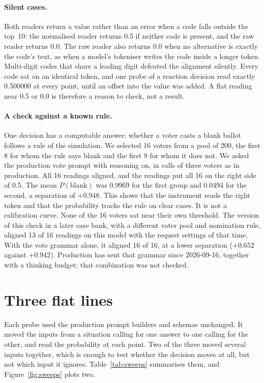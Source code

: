 \documentclass[11pt]{article}
\begin{document}
\paragraph{Silent cases.} Both readers return a value rather than an error when a code falls
outside the top~10: the normalised reader returns 0.5 if neither code is present, and the raw
reader returns 0.0. The raw reader also returns 0.0 when no alternative is exactly the code's
text, as when a model's tokeniser writes the code inside a longer token. Multi-digit codes that share a leading digit defeated the alignment silently.
Every code sat on an identical token, and one probe of a reaction decision read exactly 0.500000
at every point, until an offset into the value was added. A flat reading near 0.5 or 0.0 is
therefore a reason to check, not a result.

\paragraph{A check against a known rule.} One decision has a computable answer: whether a voter
casts a blank ballot follows a rule of the simulation. We selected 16 voters from a pool of 200,
the first 8 for whom the rule says blank and the first 8 for whom it does not. We asked the
production vote prompt with reasoning on, in calls of three voters as in production. All 16
readings aligned, and the readings put all 16 on the right side of 0.5. The mean
$P(\text{blank})$ was 0.9969 for the first group and 0.0494 for the second, a separation of
$+0.948$. This shows that the instrument reads the right token and that the probability tracks
the rule on clear cases. It is not a calibration curve. None of the 16 voters sat near their own
threshold. The version of this check in a later case bank, with a different voter pool and
nomination rule, aligned 13 of 16 readings on this model with the request settings of that
time. With the vote grammar alone, it aligned 16 of 16, at a lower separation ($+0.652$ against
$+0.942$). Production has sent that grammar since 2026-09-16, together with a thinking budget;
that combination was not checked.

\section{Three flat lines}
\label{sec:sweeps}

Each probe used the production prompt builders and schemas unchanged. It moved the inputs from
a situation calling for one answer to one calling for the other, and read the probability at
each point. Two of the three moved several inputs together, which is enough to test whether the
decision moves at all, but not which input it ignores. Table~\ref{tab:sweeps} summarises them,
and Figure~\ref{fig:sweeps} plots two.
\end{document}
